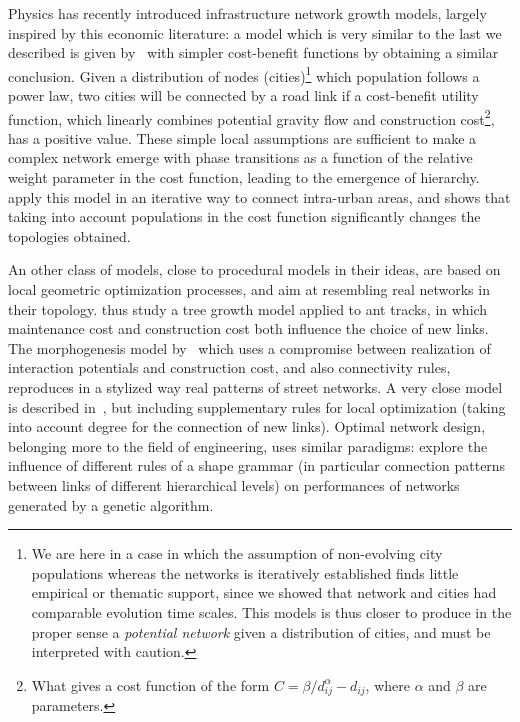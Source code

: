 \documentclass[galley]{jtlu-article-2col}
\begin{document}
 Physics has recently introduced infrastructure network growth models, largely inspired by this economic literature: a model which is very similar to the last we described is given by~\cite{louf2013emergence} with simpler cost-benefit functions by obtaining a similar conclusion. Given a distribution of nodes (cities)\footnote{We are here in a case in which the assumption of non-evolving city populations whereas the networks is iteratively established finds little empirical or thematic support, since we showed that network and cities had comparable evolution time scales. This models is thus closer to produce in the proper sense a \emph{potential network} given a distribution of cities, and must be interpreted with caution.} which population follows a power law, two cities will be connected by a road link if a cost-benefit utility function, which linearly combines potential gravity flow and construction cost\footnote{What gives a cost function of the form $C = \beta / d_{ij}^{\alpha} - d_{ij}$, where $\alpha$ and $\beta$ are parameters.}, has a positive value. These simple local assumptions are sufficient to make a complex network emerge with phase transitions as a function of the relative weight parameter in the cost function, leading to the emergence of hierarchy. \cite{zhao2016population} apply this model in an iterative way to connect intra-urban areas, and shows that taking into account populations in the cost function significantly changes the topologies obtained.
 
 An other class of models, close to procedural models in their ideas, are based on local geometric optimization processes, and aim at resembling real networks in their topology. \cite{bottinelli2017balancing} thus study a tree growth model applied to ant tracks, in which maintenance cost and construction cost both influence the choice of new links. The morphogenesis model by~\cite{courtat2011mathematics} which uses a compromise between realization of interaction potentials and construction cost, and also connectivity rules, reproduces in a stylized way real patterns of street networks. A very close model is described in~\cite{rui2013exploring}, but including supplementary rules for local optimization (taking into account degree for the connection of new links). Optimal network design, belonging more to the field of engineering, uses similar paradigms: \cite{vitins2010patterns} explore the influence of different rules of a shape grammar (in particular connection patterns between links of different hierarchical levels) on performances of networks generated by a genetic algorithm.
\end{document}
